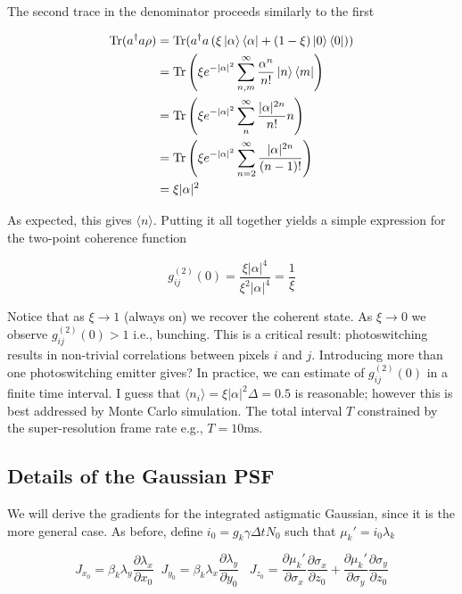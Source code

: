 The second trace in the denominator proceeds similarly to the first

\begin{align*}
\mathrm{Tr}(a^{\dagger}a\rho) &= \mathrm{Tr}(a^{\dagger}a \left(\xi\ket{\alpha}\bra{\alpha} + (1-\xi)\ket{0}\bra{0}\right))\\
&= \mathrm{Tr}\left(\xi e^{-\lvert\alpha\rvert^{2}}\sum_{n,m}^{\infty}\frac{\alpha^{n}}{n!}\ket{n}\bra{m} \right)\\
&= \mathrm{Tr}\left(\xi e^{-\lvert\alpha\rvert^{2}}\sum_{n}^{\infty}\frac{\lvert\alpha\rvert^{2n}}{n!}n\right)\\
&= \mathrm{Tr}\left(\xi e^{-\lvert\alpha\rvert^{2}}\sum_{n=2}^{\infty}\frac{\lvert\alpha\rvert^{2n}}{(n-1)!}\right)\\
&= \xi\lvert\alpha\rvert^{2}
\end{align*}

As expected, this gives $\langle n\rangle$. Putting it all together yields a simple expression for the two-point coherence function

\begin{equation*}
g^{(2)}_{ij}(0) = \frac{\xi\lvert\alpha\rvert^{4}}{\xi^{2}\lvert\alpha\rvert^{4}} = \frac{1}{\xi}
\end{equation*}

Notice that as $\xi\rightarrow 1$ (always on) we recover the coherent state. As $\xi\rightarrow 0$ we observe $g^{(2)}_{ij}(0) > 1$ i.e., bunching. This is a critical result: photoswitching results in non-trivial correlations between pixels $i$ and $j$. Introducing more than one photoswitching emitter gives? In practice, we can estimate of $g^{(2)}_{ij}(0)$ in a finite time interval. I guess that $\langle n_{i}\rangle = \xi \lvert\alpha\rvert^{2}\Delta = 0.5$ is reasonable; however this is best addressed by Monte Carlo simulation. The total interval $T$ constrained by the super-resolution frame rate e.g., $T=10\mathrm{ms}$. 


\subsection{Details of the Gaussian PSF}

We will derive the gradients for the integrated astigmatic Gaussian, since it is the more general case. As before, define $i_{0} = g_{k}\gamma\Delta t N_{0}$ such that $\mu_{k}' = i_{0}\lambda_{k}$

\begin{equation*}
J_{x_{0}} = \beta_{k}\lambda_{y}\frac{\partial \lambda_{x}}{\partial x_{0}} \;\; J_{y_{0}} = \beta_{k}\lambda_{x}\frac{\partial \lambda_{y}}{\partial y_{0}}\;\;\; J_{z_{0}}  = \frac{\partial \mu_{k}'}{\partial \sigma_{x}}\frac{\partial \sigma_{x}}{\partial z_{0}} + \frac{\partial \mu_{k}'}{\partial \sigma_{y}}\frac{\partial \sigma_{y}}{\partial z_{0}}
\end{equation*}

